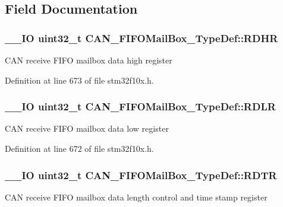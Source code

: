 \subsection{Field Documentation}
\hypertarget{struct_c_a_n___f_i_f_o_mail_box___type_def_a95890984bd67845015d40e82fb091c93}{
\subsubsection[{R\-D\-H\-R}]{\setlength{\rightskip}{0pt plus 5cm}\-\_\-\-\_\-\-I\-O {\bf uint32\-\_\-t} C\-A\-N\-\_\-\-F\-I\-F\-O\-Mail\-Box\-\_\-\-Type\-Def\-::\-R\-D\-H\-R}}\label{struct_c_a_n___f_i_f_o_mail_box___type_def_a95890984bd67845015d40e82fb091c93}
C\-A\-N receive F\-I\-F\-O mailbox data high register 

Definition at line 673 of file stm32f10x.\-h.

\hypertarget{struct_c_a_n___f_i_f_o_mail_box___type_def_ac7d62861de29d0b4fcf11fabbdbd76e7}{
\subsubsection[{R\-D\-L\-R}]{\setlength{\rightskip}{0pt plus 5cm}\-\_\-\-\_\-\-I\-O {\bf uint32\-\_\-t} C\-A\-N\-\_\-\-F\-I\-F\-O\-Mail\-Box\-\_\-\-Type\-Def\-::\-R\-D\-L\-R}}\label{struct_c_a_n___f_i_f_o_mail_box___type_def_ac7d62861de29d0b4fcf11fabbdbd76e7}
C\-A\-N receive F\-I\-F\-O mailbox data low register 

Definition at line 672 of file stm32f10x.\-h.

\hypertarget{struct_c_a_n___f_i_f_o_mail_box___type_def_a49d74ca8b402c2b9596bfcbe4cd051a9}{
\subsubsection[{R\-D\-T\-R}]{\setlength{\rightskip}{0pt plus 5cm}\-\_\-\-\_\-\-I\-O {\bf uint32\-\_\-t} C\-A\-N\-\_\-\-F\-I\-F\-O\-Mail\-Box\-\_\-\-Type\-Def\-::\-R\-D\-T\-R}}\label{struct_c_a_n___f_i_f_o_mail_box___type_def_a49d74ca8b402c2b9596bfcbe4cd051a9}
C\-A\-N receive F\-I\-F\-O mailbox data length control and time stamp register 

